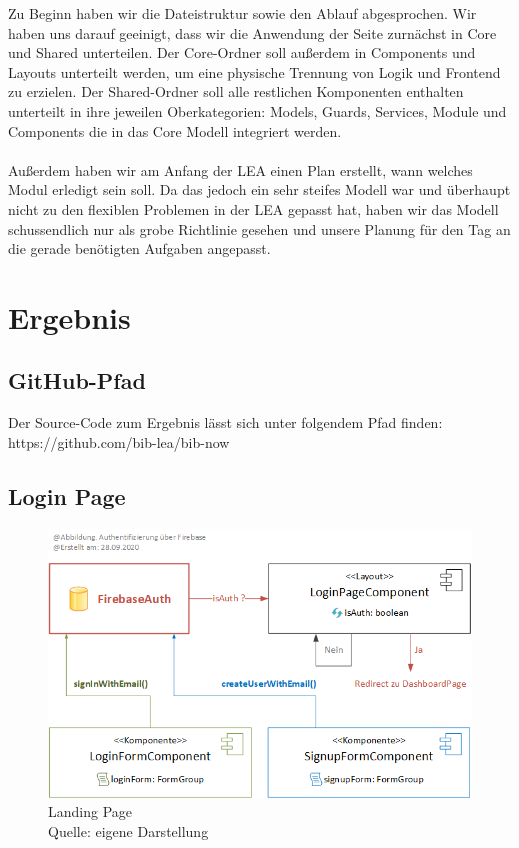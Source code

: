 \documentclass[12pt,titlepage]{article}
\begin{document}
Zu Beginn haben wir die Dateistruktur sowie den Ablauf abgesprochen. Wir haben uns darauf geeinigt, dass wir die Anwendung der Seite zurnächst in Core und Shared unterteilen. Der Core-Ordner soll außerdem in Components und Layouts unterteilt werden, um eine physische Trennung von Logik und Frontend zu erzielen. Der Shared-Ordner soll alle restlichen Komponenten enthalten unterteilt in ihre jeweilen Oberkategorien: Models, Guards, Services, Module und Components die in das Core Modell integriert werden. \\ \\

Außerdem haben wir am Anfang der LEA einen Plan erstellt, wann welches Modul erledigt sein soll. Da das jedoch ein sehr steifes Modell war und überhaupt nicht zu den flexiblen Problemen in der LEA gepasst hat, haben wir das Modell schussendlich nur als grobe Richtlinie gesehen und unsere Planung für den Tag an die gerade benötigten Aufgaben angepasst.

\newpage
\section{Ergebnis}

\subsection{GitHub-Pfad}

Der Source-Code zum Ergebnis lässt sich unter folgendem Pfad finden: \\
https://github.com/bib-lea/bib-now

\subsection{Login Page}

\begin{figure}[hbt!]
\centering
\includegraphics[width=400pt]{abbildungen/Abbildung_Authentifizierung_LoginPage.png}
\caption[Srenshot Landing Page]{Landing Page \\Quelle: eigene Darstellung}
\end{figure}
\end{document}
